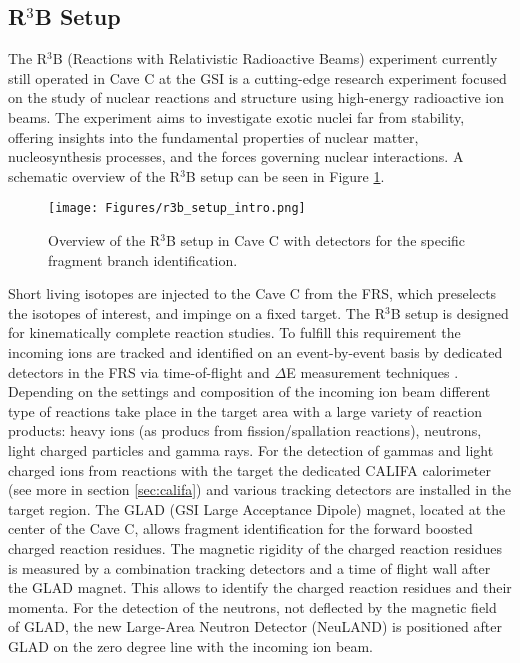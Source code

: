 \subsection{R$^3$B Setup}
The R$^3$B (Reactions with Relativistic Radioactive Beams) experiment currently still operated  in Cave C at the GSI is a cutting-edge research experiment focused on the study of nuclear reactions and structure using high-energy radioactive ion beams. The experiment aims to investigate exotic nuclei far from stability, offering insights into the fundamental properties of nuclear matter, nucleosynthesis processes, and the forces governing nuclear interactions. A schematic overview of the R$^3$B setup can be seen in Figure \ref{fig:r3b_setup_intro}.\newline
\begin{figure}[htpb]
    \centering
    \texttt{[image: Figures/r3b\_setup\_intro.png]}
    \caption{
    Overview of the R$^3$B setup in Cave C with detectors for the specific fragment branch identification.
    } 
    \label{fig:r3b_setup_intro}
\end{figure}
Short living isotopes are injected to the Cave C from the FRS, which preselects the isotopes of interest, and impinge on a fixed target. The R$^3$B setup is designed for kinematically complete reaction studies. To fulfill this requirement the incoming ions are tracked and identified on an event-by-event basis by dedicated detectors in the FRS via time-of-flight and $\Delta$E measurement techniques \cite{nociforo2014time}. Depending on the settings and composition of the incoming ion beam different type of reactions take place in the target area with a large variety of reaction products: heavy ions (as producs from fission/spallation reactions), neutrons, light charged particles and gamma rays. For the detection of gammas and light charged ions from reactions with the target the dedicated CALIFA calorimeter (see more in section \ref{sec:califa}) and various tracking detectors are installed in the target region. The GLAD (GSI Large Acceptance Dipole) magnet, located at the center of the Cave C, allows fragment identification for the forward boosted charged reaction residues. The magnetic rigidity of the charged reaction residues is measured by a combination tracking detectors and a time of flight wall after the GLAD magnet. This allows to identify the charged reaction residues and their momenta. For the detection of the neutrons, not deflected by the magnetic field of GLAD, the new Large-Area Neutron Detector (NeuLAND) is positioned after GLAD on the zero degree line with the incoming ion beam.\newline
